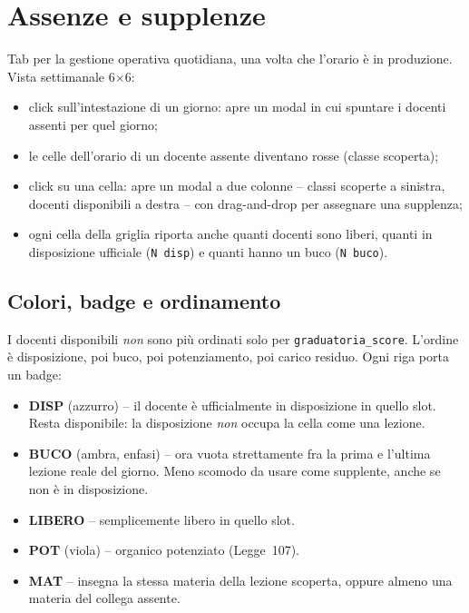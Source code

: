 \section{Assenze e supplenze}
\label{sec:tab_assenze_supplenze}

Tab per la gestione operativa quotidiana, una volta che
l'orario \`e in produzione. Vista settimanale 6$\times$6:

\begin{itemize}
\item click sull'intestazione di un giorno: apre un modal in
  cui spuntare i docenti assenti per quel giorno;
\item le celle dell'orario di un docente assente diventano
  rosse (classe scoperta);
\item click su una cella: apre un modal a due colonne --
  classi scoperte a sinistra, docenti disponibili a destra --
  con drag-and-drop per assegnare una supplenza;
\item ogni cella della griglia riporta anche quanti docenti
  sono liberi, quanti in disposizione ufficiale
  (\texttt{N disp}) e quanti hanno un buco (\texttt{N buco}).
\end{itemize}

\subsection{Colori, badge e ordinamento}

I docenti disponibili \emph{non} sono pi\`u ordinati solo per
\texttt{graduatoria\_score}. L'ordine \`e disposizione,
poi buco, poi potenziamento, poi carico residuo. Ogni riga
porta un badge:

\begin{itemize}
\item \textbf{DISP} (azzurro) -- il docente \`e ufficialmente
  in disposizione in quello slot. Resta disponibile: la
  disposizione \emph{non} occupa la cella come una lezione.
\item \textbf{BUCO} (ambra, enfasi) -- ora vuota strettamente
  fra la prima e l'ultima lezione reale del giorno. Meno
  scomodo da usare come supplente, anche se non \`e in
  disposizione.
\item \textbf{LIBERO} -- semplicemente libero in quello slot.
\item \textbf{POT} (viola) -- organico potenziato
  (Legge~107).
\item \textbf{MAT} -- insegna la stessa materia della lezione
  scoperta, oppure almeno una materia del collega assente.
\end{itemize}

